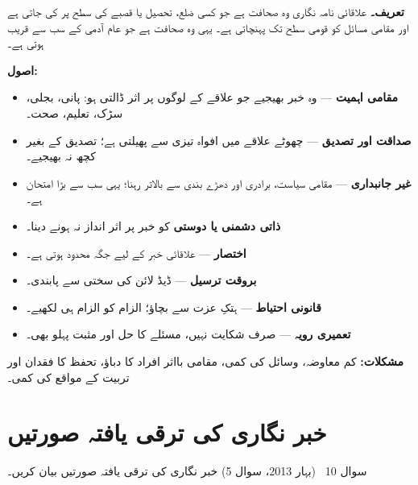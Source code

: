 \begin{hal}
\textbf{تعریف۔} علاقائی نامہ نگاری وہ صحافت ہے جو کسی ضلع، تحصیل یا قصبے کی
سطح پر کی جاتی ہے اور مقامی مسائل کو قومی سطح تک پہنچاتی ہے۔ یہی وہ صحافت ہے
جو عام آدمی کے سب سے قریب ہوتی ہے۔

\medskip
\textbf{اصول:}
\begin{itemize}\setlength{\itemsep}{1pt}
  \item \textbf{مقامی اہمیت} --- وہ خبر بھیجیے جو علاقے کے لوگوں پر اثر ڈالتی
        ہو: پانی، بجلی، سڑک، تعلیم، صحت۔
  \item \textbf{صداقت اور تصدیق} --- چھوٹے علاقے میں افواہ تیزی سے پھیلتی ہے؛
        تصدیق کے بغیر کچھ نہ بھیجیے۔
  \item \textbf{غیر جانبداری} --- مقامی سیاست، برادری اور دھڑے بندی سے بالاتر
        رہنا؛ یہی سب سے بڑا امتحان ہے۔
  \item \textbf{ذاتی دشمنی یا دوستی} کو خبر پر اثر انداز نہ ہونے دینا۔
  \item \textbf{اختصار} --- علاقائی خبر کے لیے جگہ محدود ہوتی ہے۔
  \item \textbf{بروقت ترسیل} --- ڈیڈ لائن کی سختی سے پابندی۔
  \item \textbf{قانونی احتیاط} --- ہتکِ عزت سے بچاؤ؛ الزام کو الزام ہی لکھیے۔
  \item \textbf{تعمیری رویہ} --- صرف شکایت نہیں، مسئلے کا حل اور مثبت پہلو بھی۔
\end{itemize}

\medskip
\textbf{مشکلات:} کم معاوضہ، وسائل کی کمی، مقامی بااثر افراد کا دباؤ، تحفظ کا
فقدان اور تربیت کے مواقع کی کمی۔

\end{hal}

\section*{خبر نگاری کی ترقی یافتہ صورتیں}

\begin{sawal}{سوال \textenglish{10} \ \textnormal{\small(بہار \textenglish{2013}، سوال \textenglish{5})}}
خبر نگاری کی ترقی یافتہ صورتیں بیان کریں۔
\end{sawal}

